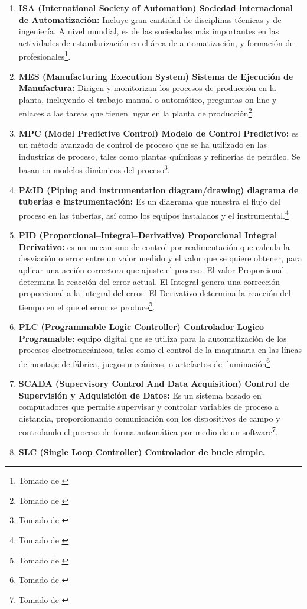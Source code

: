 \documentclass[10pt,graphicx,caption,rotating]{article}
\begin{document}
\begin{enumerate}
 \item \textbf{ISA (International Society of Automation) Sociedad internacional de Automatización:} Incluye gran cantidad de disciplinas técnicas y de ingeniería. A nivel mundial, es de las sociedades más importantes en las actividades de estandarización en el área de automatización, y formación de profesionales\footnote{Tomado de \cite{page9}}.

 \item \textbf{MES (Manufacturing Execution System) Sistema de Ejecución de Manufactura:} Dirigen y monitorizan los procesos de producción en la planta, incluyendo el trabajo manual o automático, preguntas on-line y enlaces a las tareas que tienen lugar en la planta de producción\footnote{Tomado de \cite{page10}}.

 \item \textbf{MPC (Model Predictive Control) Modelo de Control Predictivo:} es un método avanzado de control de proceso que se ha utilizado en las industrias de proceso, tales como plantas químicas y refinerías de petróleo. Se basan en modelos dinámicos del proceso\footnote{Tomado de \cite{page11}}.

 \item \textbf{P\&ID (Piping and instrumentation diagram/drawing) diagrama de tuberías e instrumentación:} Es un diagrama que muestra el flujo del proceso en las tuberías, así como los equipos instalados y el instrumental.\footnote{Tomado de \cite{page12}}

 \item \textbf{PID (Proportional–Integral–Derivative) Proporcional Integral Derivativo:} es un mecanismo de control por realimentación que calcula la desviación o error entre un valor medido y el valor que se quiere obtener, para aplicar una acción correctora que ajuste el proceso. El valor Proporcional determina la reacción del error actual. El Integral genera una corrección proporcional a la integral del error. El Derivativo determina la reacción del tiempo en el que el error se produce\footnote{Tomado de \cite{page13}}.

 \item \textbf{PLC (Programmable Logic Controller) Controlador Logico Programable:} equipo digital que se utiliza para la automatización de los procesos electromecánicos, tales como el control de la maquinaria en las líneas de montaje de fábrica, juegos mecánicos, o artefactos de iluminación\footnote{Tomado de \cite{page14}}

 \item \textbf{SCADA (Supervisory Control And Data Acquisition) Control de Supervisión y Adquisición de Datos:} Es un sistema basado en computadores que permite supervisar y controlar variables de proceso a distancia, proporcionando comunicación con los dispositivos de campo y controlando el proceso de forma automática por medio de un software\footnote{Tomado de \cite{page15}}.

 \item \textbf{SLC (Single Loop Controller) Controlador de bucle simple.}
\end{enumerate}
\end{document}
